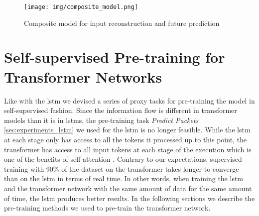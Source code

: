 \begin{figure}[h]
	\centering
	\texttt{[image: img/composite\_model.png]}
	\caption{Composite model for input reconstruction and future prediction}
	\label{fig:experiments:unsupervised_lstm_composite}
\end{figure}	

\section{Self-supervised Pre-training for Transformer Networks} \label{sec:experiments:transformer}

Like with the \gls{lstm} we devised a series of proxy tasks for pre-training the model in self-supervised fashion. Since the information flow is different in transformer models than it is in \glspl{lstm}, the pre-training task \textit{Predict Packets} \ref{sec:experiments_lstm} we used for the \gls{lstm} is no longer feasible. While the \gls{lstm} at each stage only has access to all the tokens it processed up to this point, the transformer has access to all input tokens at each stage of the execution which is one of the benefits of self-attention \cite{attention}. Contrary to our expectations, supervised training with 90\% of the dataset on the transformer takes longer to converge than on the \gls{lstm} in terms of real time. In other words, when training the \gls{lstm} and the transformer network with the same amount of data for the same amount of time, the \gls{lstm} produces better results. In the following sections we describe the pre-training methods we used to pre-train the transformer network.


